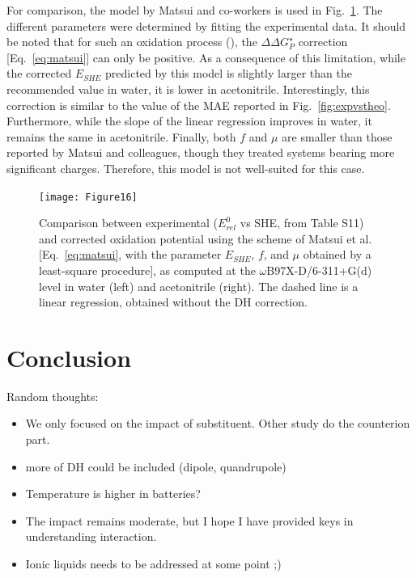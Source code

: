 \documentclass[review,preprint]{elsarticle}
\begin{document}
For comparison, the model by Matsui and co-workers \cite{matsuiDensityFunctionalTheory2013} is used in Fig.~\ref{fig:matsui}. The different parameters were determined by fitting the experimental data. It should be noted that for such an oxidation process (), the $\Delta\Delta G^\star_P$ correction [Eq.~\eqref{eq:matsui}] can only be positive. As a consequence of this limitation, while the corrected $E_{SHE}$ predicted by this model is slightly larger than the recommended value in water, it is lower in acetonitrile. Interestingly, this correction is similar to the value of the MAE reported in Fig.~\ref{fig:expvstheo}. Furthermore, while the slope of the linear regression improves in water, it remains the same in acetonitrile. Finally, both $f$ and $\mu$ are smaller than those reported by Matsui and colleagues, though they treated systems bearing more significant charges. Therefore, this model is not well-suited for this case.


\begin{figure}[!h]
	\centering
	\texttt{[image: Figure16]}
	\caption{Comparison between experimental ($E^0_{rel} $ vs SHE, from Table S11) and corrected oxidation potential using the scheme of Matsui et al. \cite{matsuiDensityFunctionalTheory2013} [Eq.~\eqref{eq:matsui}, with the parameter $E_{SHE}$, $f$, and $\mu$ obtained by a least-square procedure], as computed at the $\omega$B97X-D/6-311+G(d) level in water (left) and acetonitrile (right). The dashed line is a linear regression, obtained without the DH correction. }
	\label{fig:matsui}
\end{figure}

\clearpage
\section{Conclusion} \label{sec:conclusion}

Random thoughts:\begin{itemize}
	\item We only focused on the impact of substituent. Other study do the counterion part.
	\item more of DH could be included (dipole, quandrupole)
	\item Temperature is higher in batteries?
	\item The impact remains moderate, but I hope I have provided keys in understanding interaction.
	\item Ionic liquids needs to be addressed at some point ;)
\end{itemize}
	
	
 

	
\end{document}

